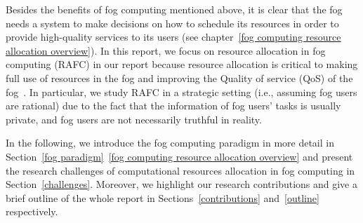 \documentclass[11pt]{phdthesis}
\begin{document}
Besides the benefits of fog computing mentioned above, it is clear that the fog needs a system to make decisions on how to schedule its resources in order to provide high-quality services to its users (see chapter~\ref{fog computing resource allocation overview}). In this report, we focus on resource allocation in fog computing (RAFC) in our report because resource allocation is critical to making full use of resources in the fog and improving the Quality of service (QoS) of the fog~\citep{mahmud2018fog}. In particular, we study RAFC in a strategic setting (i.e., assuming fog users are rational) due to the fact that the information of fog users' tasks is usually private, and fog users are not necessarily truthful in reality.

In the following, we introduce the fog computing paradigm in more detail in Section~\ref{fog paradigm}~\ref{fog computing resource allocation overview} and present the research challenges of computational resources allocation in fog computing in Section~\ref{challenges}. Moreover, we highlight our research contributions and give a brief outline of the whole report in Sections~\ref{contributions} and~\ref{outline} respectively. 
\end{document}

